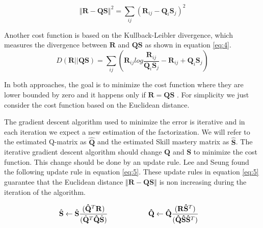 \begin{equation}
\left\Vert \mathbf{R}-\mathbf{Q}\mathbf{S}\right\Vert ^{2}=\sum_{{\scriptscriptstyle ij}}(\mathbf{R}_{ij}-\mathbf{Q}_{i}\mathbf{S}_{j})^2\label{eq:3}
\end{equation}


  
Another cost function  is based on the Kullback-Leibler divergence, which measures the divergence between $\mathbf{R}$ and $\mathbf{Q}\mathbf{S}$ as shown in equation \eqref{eq:4}. 
\begin{equation}
D(\mathbf{R}||\mathbf{Q}\mathbf{S})=\sum_{{\scriptscriptstyle ij}}(\mathbf{R}_{ij}log\frac{\mathbf{R}_{ij}}{\mathbf{Q}_{i}\mathbf{S}_{j}}-\mathbf{R}_{ij}+\mathbf{Q}_{i}\mathbf{S}_{j})\label{eq:4}
\end{equation}

In both approaches, the goal is
to minimize the cost function where they are lower bounded by zero and it happens only if $\mathbf{R}=\mathbf{Q}\mathbf{S}$ \citep{seung2001algorithms}. For simplicity we just consider the cost function based on the Euclidean
distance.

The gradient descent algorithm used to minimize the error is iterative and in each iteration we expect a new estimation of the factorization. We will refer to the estimated Q-matrix{ as} $\hat{\mathbf{Q}}$ and{ the} estimated Skill mastery matrix{ as} $\hat{\mathbf{S}}$.  The iterative gradient descent algorithm should change $\mathbf{Q}$ and $\mathbf{S}$ to minimize the cost function. This change should be done by an update rule. Lee and Seung \citep{seung2001algorithms} found the following update rule in equation \eqref{eq:5}. These update rules in equation \eqref{eq:5} guarantee that the Euclidean distance $\left\Vert \mathbf{R}-\mathbf{Q}\mathbf{S}\right\Vert $ is non increasing during the iteration of the algorithm.

\begin{equation}
\begin{aligned}\hat{\mathbf{S}}\leftarrow\hat{\mathbf{S}}\frac{(\mathbf{\hat{Q}}^{T}\mathbf{R})}{(\hat{\mathbf{Q}}^{T}\mathbf{\hat{Q}}\hat{\mathbf{S}})}\end{aligned}
\hspace{20mm}\begin{aligned} & \mathbf{\hat{Q}}\leftarrow\mathbf{\hat{Q}}\frac{(\mathbf{R}\mathbf{\hat{\mathbf{S}}}^{T})}{(\mathbf{\hat{Q}}\mathbf{\hat{\mathbf{S}}}\mathbf{\hat{\mathbf{S}}}^{T})}\end{aligned}
\label{eq:5}
\end{equation}


